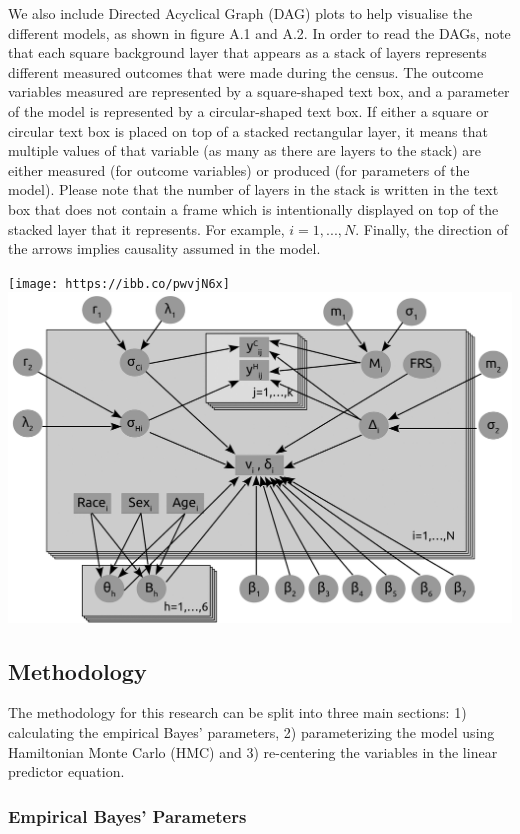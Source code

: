 \documentclass[
]{article}
\begin{document}
We also include Directed Acyclical Graph (DAG) plots to help visualise
the different models, as shown in figure A.1 and A.2. In order to read
the DAGs, note that each square background layer that appears as a stack
of layers represents different measured outcomes that were made during
the census. The outcome variables measured are represented by a
square-shaped text box, and a parameter of the model is represented by a
circular-shaped text box. If either a square or circular text box is
placed on top of a stacked rectangular layer, it means that multiple
values of that variable (as many as there are layers to the stack) are
either measured (for outcome variables) or produced (for parameters of
the model). Please note that the number of layers in the stack is
written in the text box that does not contain a frame which is
intentionally displayed on top of the stacked layer that it represents.
For example, \(i=1,...,N\). Finally, the direction of the arrows implies
causality assumed in the model.

\texttt{[image: https://ibb.co/pwvjN6x]}
\includegraphics{../DAG_FRS.png}

\hypertarget{methodology}{%
\subsection{Methodology}\label{methodology}}

The methodology for this research can be split into three main sections:
1) calculating the empirical Bayes' parameters, 2) parameterizing the
model using Hamiltonian Monte Carlo (HMC) and 3) re-centering the
variables in the linear predictor equation.

\hypertarget{empirical-bayes-parameters}{%
\subsubsection{Empirical Bayes'
Parameters}\label{empirical-bayes-parameters}}
\end{document}
